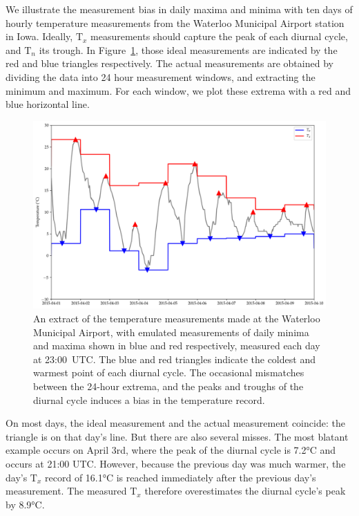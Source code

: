 \documentclass[letter]{article}
\makeatletter
\def\maxwidth{\ifdim\Gin@nat@width>\linewidth\linewidth
\else\Gin@nat@width\fi}
\let\Oldincludegraphics\includegraphics
\renewcommand{\includegraphics}[1]{\Oldincludegraphics[width=.8\maxwidth]{#1}}
\newcommand{\T}{\mathrm{T}}
\newcommand{\Tn}{\T_{n}}
\newcommand{\Tx}{\T_{x}}
\makeatother
\begin{document}
\label{sec:illustrate_bias}
        We illustrate the measurement bias in daily maxima and minima with ten days of hourly temperature measurements from the Waterloo Municipal Airport station in Iowa.
Ideally, \(\Tx\) measurements should capture the peak of each diurnal cycle, and \(\Tn\) its trough.
In Figure~\ref{fig:waterloo_triangles}, those ideal measurements are indicated by the red and blue triangles respectively.
The actual measurements are obtained by dividing the data into 24 hour measurement windows, and extracting the minimum and maximum.
For each window, we plot these extrema with a red and blue horizontal line.

\begin{figure}
\centering
\includegraphics{../figures/waterloo_triangles.png}
\caption{\label{fig:waterloo_triangles}
An extract of the temperature measurements made at the Waterloo Municipal Airport,
with emulated measurements of daily minima and maxima shown in blue and red respectively,
measured each day at 23:00~UTC.
The blue and red triangles indicate the coldest and warmest point of each diurnal cycle.
The occasional mismatches between the 24-hour extrema, and the peaks and troughs of the diurnal cycle induces a bias in the temperature record.}
\end{figure}

On most days, the ideal measurement and the actual measurement coincide: the triangle is on that day's line.
But there are also several misses. The most blatant example occurs on April 3rd,
where the peak of the diurnal cycle is 7.2°C and occurs at 21:00 UTC.
However, because the previous day was much warmer, the day's \(\Tx\) record of 16.1°C is reached immediately after the previous day's measurement.
The measured \(\Tx\) therefore overestimates the diurnal cycle's peak by 8.9°C.
    
\end{document}
